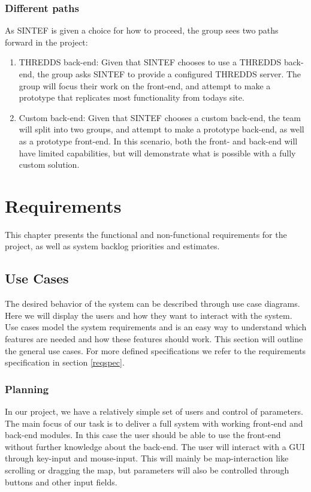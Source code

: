 \documentclass[11pt,a4paper,titlepage,oneside]{report}
\begin{document}
\subsection{Different paths}
As SINTEF is given a choice for how to proceed, the group sees two paths forward in the project:
\begin{enumerate}
\item \gls{THREDDS} \gls{back-end}: Given that SINTEF chooses to use a \gls{THREDDS} \gls{back-end}, the group asks SINTEF to provide a configured \gls{THREDDS} server. The group will focus their work on the \gls{front-end}, and attempt to make a \gls{prototype} that replicates most functionality from todays site.
\item Custom \gls{back-end}: Given that SINTEF chooses a custom \gls{back-end}, the team will split into two groups, and attempt to make a \gls{prototype} \gls{back-end}, as well as a \gls{prototype} \gls{front-end}. In this scenario, both the front- and \gls{back-end} will have limited capabilities, but will demonstrate what is possible with a fully custom solution.
\end{enumerate}


\chapter{Requirements}
\label{chap:Requirements}
This chapter presents the functional and non-functional requirements for the project, as well as system backlog priorities and estimates.

\section{Use Cases}
The desired behavior of the system can be described through use case diagrams. Here we will display the users and how they want to interact with the system. Use cases model the system requirements and is an easy way to understand which features are needed and how these features should work. This section will outline the general use cases. For more defined specifications we refer to the requirements specification in section \ref{reqspec}.

  \subsection{Planning}
  In our project, we have a relatively simple set of users and control of parameters. The main focus of our task is to deliver a full system with working \gls{front-end} and \gls{back-end} modules. In this case the user should be able to use the \gls{front-end} without further knowledge about the \gls{back-end}. The user will interact with a \gls{GUI} through key-input and mouse-input. This will mainly be map-interaction like scrolling or dragging the map, but parameters will also be controlled through buttons and other input fields.
\end{document}
